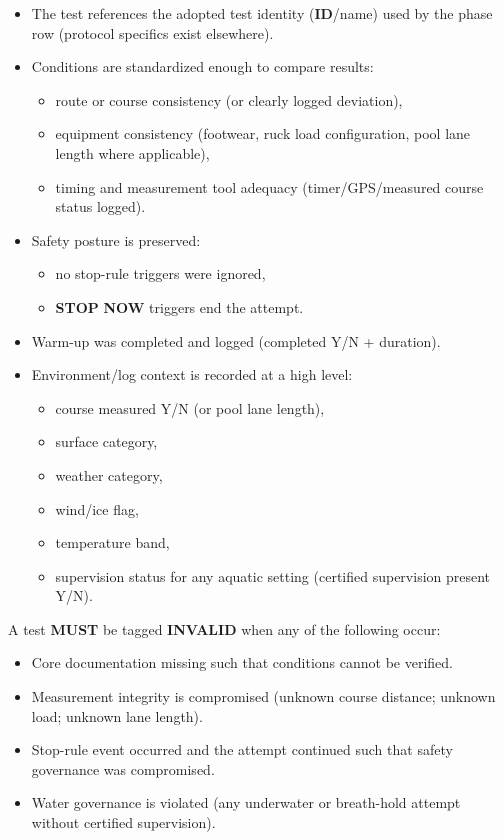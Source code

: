 \documentclass[10pt]{article}
\begin{document}
\begin{itemize}
\item The test references the adopted test identity (\textbf{ID}/name) used by the phase row (protocol specifics exist elsewhere).
\item Conditions are standardized enough to compare results:
\begin{itemize}
\item route or course consistency (or clearly logged deviation),
\item equipment consistency (footwear, ruck load configuration, pool lane length where applicable),
\item timing and measurement tool adequacy (timer/GPS/measured course status logged).
\end{itemize}
\item Safety posture is preserved:
\begin{itemize}
\item no stop-rule triggers were ignored,
\item \textbf{STOP} \textbf{NOW} triggers end the attempt.
\end{itemize}
\item Warm-up was completed and logged (completed Y/N + duration).
\item Environment/log context is recorded at a high level:
\begin{itemize}
\item course measured Y/N (or pool lane length),
\item surface category,
\item weather category,
\item wind/ice flag,
\item temperature band,
\item supervision status for any aquatic setting (certified supervision present Y/N).
\end{itemize}
\end{itemize}

A test \textbf{MUST} be tagged \textbf{INVALID} when any of the following occur:

\begin{itemize}
\item Core documentation missing such that conditions cannot be verified.
\item Measurement integrity is compromised (unknown course distance; unknown load; unknown lane length).
\item Stop-rule event occurred and the attempt continued such that safety governance was compromised.
\item Water governance is violated (any underwater or breath-hold attempt without certified supervision).
\end{itemize}
\end{document}
